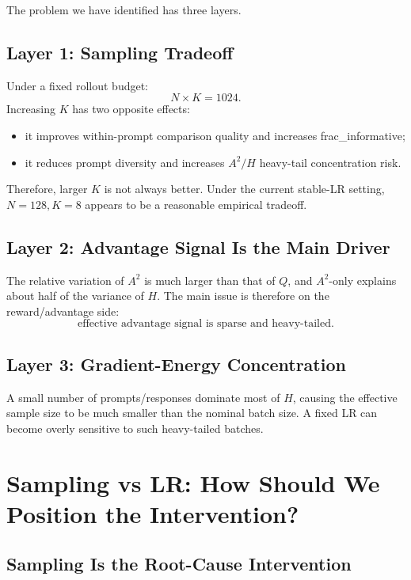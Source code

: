 \documentclass[11pt,a4paper]{article}
\begin{document}
The problem we have identified has three layers.

\subsection{Layer 1: Sampling Tradeoff}

Under a fixed rollout budget:
\[
N\times K=1024.
\]
Increasing \(K\) has two opposite effects:
\begin{itemize}[leftmargin=2em]
    \item it improves within-prompt comparison quality and increases frac\_informative;
    \item it reduces prompt diversity and increases \(A^2/H\) heavy-tail concentration risk.
\end{itemize}
Therefore, larger \(K\) is not always better. Under the current stable-LR setting, \(N=128,K=8\) appears to be a reasonable empirical tradeoff.

\subsection{Layer 2: Advantage Signal Is the Main Driver}

The relative variation of \(A^2\) is much larger than that of \(Q\), and \(A^2\)-only explains about half of the variance of \(H\). The main issue is therefore on the reward/advantage side:
\[
\boxed{
\text{effective advantage signal is sparse and heavy-tailed.}
}
\]

\subsection{Layer 3: Gradient-Energy Concentration}

A small number of prompts/responses dominate most of \(H\), causing the effective sample size to be much smaller than the nominal batch size. A fixed LR can become overly sensitive to such heavy-tailed batches.

\section{Sampling vs LR: How Should We Position the Intervention?}

\subsection{Sampling Is the Root-Cause Intervention}
\end{document}
